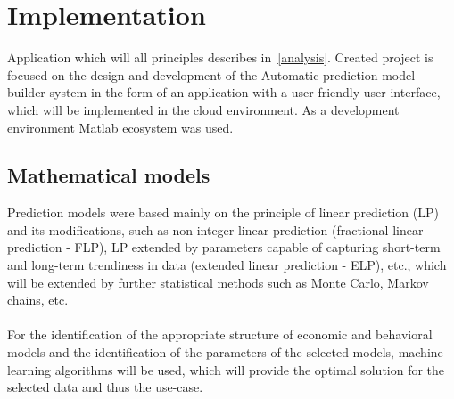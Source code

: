\chapter{Implementation}
    Application which will all principles describes in~\ref{analysis}. Created project is focused on the design and development of the Automatic prediction model builder system in the form of an application with a user-friendly user interface, which will be implemented in the cloud environment. As a development environment Matlab ecosystem was used.
    \section{Mathematical models}
    Prediction models were based mainly on the principle of linear prediction (LP) and its modifications, such as non-integer linear prediction (fractional linear prediction - FLP), LP extended by parameters capable of capturing short-term and long-term trendiness in data (extended linear prediction - ELP), etc., which will be extended by further statistical methods such as Monte Carlo, Markov chains, etc.\\
    \\
    For the identification of the appropriate structure of economic and behavioral models and the identification of the parameters of the selected models, machine learning algorithms will be used, which will provide the optimal solution for the selected data and thus the use-case.
